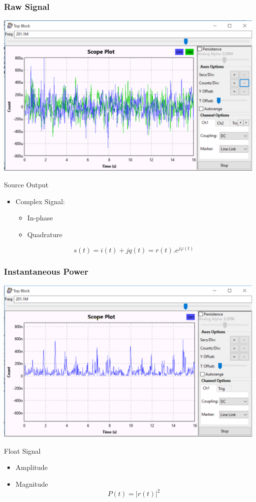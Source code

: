 \begin{frame}
	\frametitle{Raw Signal}
	\centering \includegraphics[scale=.35]{images/raw_sig.png}
	\begin{block}{Source Output}
		\begin{itemize}
			\item Complex Signal:
			\begin{itemize}
				\item In-phase 
				\item Quadrature
			\end{itemize}
			\[s(t)=i(t)+jq(t)=r(t).e^{j\varphi(t)} \]
		\end{itemize}
	\end{block}
\end{frame}

\begin{frame}
	\frametitle{Instantaneous Power}
	\centering \includegraphics[scale=.35]{images/apres_mag2.png}
	\begin{block}{Float Signal}
		\begin{itemize}
			\item Amplitude
			\item Magnitude
			\[P(t)=|r(t)|^2\]
		\end{itemize}
	\end{block}
\end{frame}

